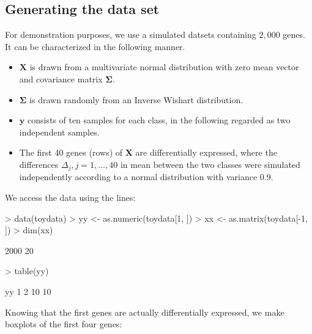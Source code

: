 \subsection{Generating the data set}
For demonstration purposes, we use a simulated datsets containing $2,000$
genes. It can be characterized in the following manner.
\begin{itemize}
\item $\bm{X}$ is drawn from a multivariate normal distribution
      with zero mean vector and covariance matrix $\bm{\Sigma}$.
\item $\bm{\Sigma}$ is drawn randomly from an Inverse Wishart
      distribution.
\item $\bm{y}$ consists of ten samples for each class, in the
      following regarded as two independent samples.
\item The first 40 genes (rows) of $\bm{X}$ are differentially
      expressed, where the differences $\Delta_j, j=1,\ldots,40$
      in mean between the two classes were simulated independently
      according to a normal distribution with variance 0.9.
\end{itemize}
We access the data using the lines:
\begin{Schunk}
\begin{Sinput}
> data(toydata)
> yy <- as.numeric(toydata[1, ])
> xx <- as.matrix(toydata[-1, ])
> dim(xx)
\end{Sinput}
\begin{Soutput}
[1] 2000   20
\end{Soutput}
\begin{Sinput}
> table(yy)
\end{Sinput}
\begin{Soutput}
yy
 1  2 
10 10 
\end{Soutput}
\end{Schunk}


Knowing that the first genes are actually differentially expressed, we make
boxplots of the first four genes:

